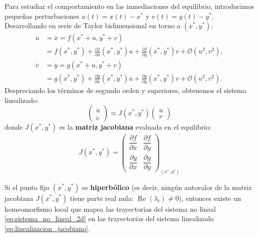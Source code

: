Para estudiar el comportamiento en las inmediaciones del equilibrio, introducimos pequeñas perturbaciones $u(t) = x(t) - x^*$ y $v(t) = y(t) - y^*$. Desarrollando en serie de Taylor bidimensional en torno a $(x^*, y^*)$:
\begin{equation}
\begin{aligned}
    \dot{u} &= \dot{x} = f(x^*+u, y^*+v) \\
            &= f(x^*,y^*) + \frac{\partial f}{\partial x}(x^*,y^*) u + \frac{\partial f}{\partial y}(x^*,y^*) v + \mathcal{O}(u^2, v^2), \\
    \dot{v} &= \dot{y} = g(x^*+u, y^*+v) \\
            &= g(x^*,y^*) + \frac{\partial g}{\partial x}(x^*,y^*) u + \frac{\partial g}{\partial y}(x^*,y^*) v + \mathcal{O}(u^2, v^2).
\end{aligned}
\end{equation}
Despreciando los términos de segundo orden y superiores, obtenemos el sistema linealizado:
\begin{equation}
    \begin{pmatrix} \dot{u} \\ \dot{v} \end{pmatrix} \approx J(x^*, y^*) \begin{pmatrix} u \\ v \end{pmatrix}
    \label{eq:linealizacion_jacobiano}
\end{equation}
donde $J(x^*, y^*)$ es la \textbf{matriz jacobiana} evaluada en el equilibrio:
\begin{equation}
    J(x^*, y^*) = \begin{pmatrix}
        \dfrac{\partial f}{\partial x} & \dfrac{\partial f}{\partial y} \\[8pt]
        \dfrac{\partial g}{\partial x} & \dfrac{\partial g}{\partial y}
    \end{pmatrix}_{(x^*, y^*)}
    \label{eq:def_jacobiano}
\end{equation}

\begin{theorem}
Si el punto fijo $(x^*, y^*)$ es \textbf{hiperbólico} (es decir, ningún autovalor de la matriz jacobiana $J(x^*, y^*)$ tiene parte real nula: $\operatorname{Re}(\lambda_i) \neq 0$), entonces existe un homeomorfismo local que mapea las trayectorias del sistema no lineal \eqref{eq:sistema_no_lineal_2d} en las trayectorias del sistema linealizado \eqref{eq:linealizacion_jacobiano}.
\end{theorem}

